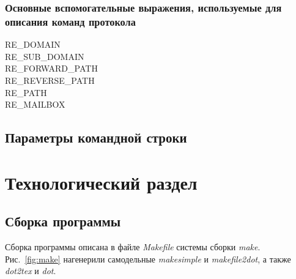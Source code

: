 \documentclass[a4paper,12pt]{report}
\begin{document}
\subsection{ Основные вспомогательные выражения, используемые для описания команд протокола}
\begin{description}
\item[RE\_DOMAIN]

\item[RE\_SUB\_DOMAIN]

\item[RE\_FORWARD\_PATH]

\item[RE\_REVERSE\_PATH]

\item[RE\_PATH]

\item[RE\_MAILBOX]

\end{description}



\section{Параметры командной строки}



% 

\chapter{Технологический раздел}


\section{Сборка программы}

Сборка программы описана в файле \textit{Makefile} системы сборки \textit{make}. Рис.~\ref{fig:make} нагенерили самодельные \textit{makesimple} и \textit{makefile2dot}, а также \textit{dot2tex} и \textit{dot}.
\end{document}
